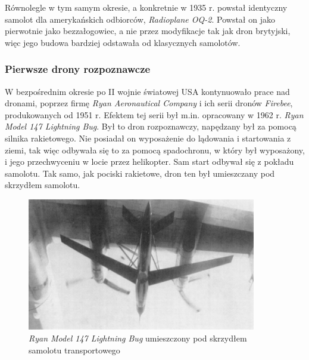 Równolegle w tym samym okresie, a konkretnie w 1935 r. powstał identyczny samolot dla amerykańskich odbiorców, \textit{Radioplane OQ-2}. Powstał on jako pierwotnie jako bezzałogowiec, a nie przez modyfikacje tak jak dron brytyjski, więc jego budowa bardziej odstawała od klasycznych samolotów.\cite{queen-bee}\cite{dron-ibuk}

\subsubsection{Pierwsze drony rozpoznawcze}
W bezpośrednim okresie po II wojnie światowej USA kontynuowało prace nad dronami, poprzez firmę \textit{Ryan Aeronautical Company} i ich serii dronów \textit{Firebee}, produkowanych od 1951 r. Efektem tej serii był m.in. opracowany w 1962 r. \textit{Ryan Model 147 Lightning Bug}. Był to dron rozpoznawczy, napędzany był za pomocą silnika rakietowego. Nie posiadał on wyposażenie do lądowania i startowania z ziemi, tak więc odbywała się to za pomocą spadochronu, w który był wyposażony, i jego przechwyceniu w locie przez helikopter. Sam start odbywał się z pokładu samolotu. Tak samo, jak pociski rakietowe, dron ten był umieszczany pod skrzydłem samolotu.

\begin{figure}[!ht]
  \centering
  \includegraphics[width=10cm]{./Obrazy/Model_147_RPV.png}
  \caption{\textit{Ryan Model 147 Lightning Bug} umieszczony pod skrzydłem samolotu transportowego}
  \end{figure}

